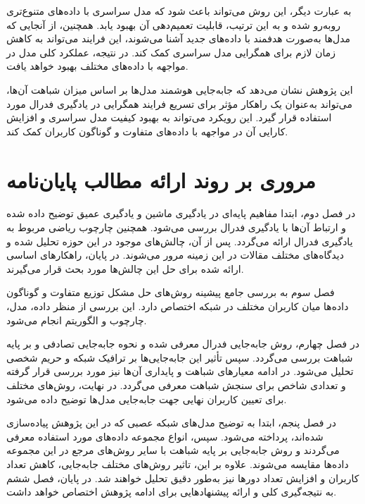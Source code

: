 به عبارت دیگر، این روش می‌تواند باعث شود که مدل سراسری با داده‌های متنوع‌تری روبه‌رو شده و به این ترتیب، قابلیت تعمیم‌دهی آن بهبود یابد. همچنین، از آنجایی که مدل‌ها به‌صورت هدفمند با داده‌های جدید آشنا می‌شوند، این فرایند می‌تواند به کاهش زمان لازم برای همگرایی مدل سراسری کمک کند. در نتیجه، عملکرد کلی مدل در مواجهه با داده‌های مختلف بهبود خواهد یافت.

این پژوهش نشان می‌دهد که جابه‌جایی هوشمند مدل‌ها بر اساس میزان شباهت آن‌ها، می‌تواند به‌عنوان یک راهکار مؤثر برای تسریع فرایند همگرایی در یادگیری فدرال مورد استفاده قرار گیرد. این رویکرد می‌تواند به بهبود کیفیت مدل سراسری و افزایش کارایی آن در مواجهه با داده‌های متفاوت و گوناگون کاربران کمک کند.



\section{مروری بر روند ارائه مطالب پایان‌نامه}

در فصل دوم، ابتدا مفاهیم پایه‌ای در یادگیری ماشین و یادگیری عمیق توضیح داده شده و ارتباط آن‌ها با یادگیری فدرال بررسی می‌شود. همچنین چارچوب ریاضی مربوط به یادگیری فدرال ارائه می‌گردد. پس از آن، چالش‌های موجود در این حوزه تحلیل شده و دیدگاه‌های مختلف مقالات در این زمینه مرور می‌شوند. در پایان، راهکارهای اساسی ارائه شده برای حل این چالش‌ها مورد بحث قرار می‌گیرند.

فصل سوم به بررسی جامع پیشینه روش‌های حل مشکل توزیع متفاوت و گوناگون داده‌ها میان کاربران مختلف در شبکه اختصاص دارد. این بررسی از منظر داده، مدل، چارچوب و الگوریتم انجام می‌شود.

در فصل چهارم، روش جابه‌جایی فدرال معرفی شده و نحوه جابه‌جایی تصادفی و بر پایه شباهت بررسی می‌گردد. سپس تأثیر این جابه‌جایی‌ها بر ترافیک شبکه و حریم شخصی تحلیل می‌شود. در ادامه معیارهای شباهت و پایداری آن‌ها نیز مورد بررسی قرار گرفته و تعدادی شاخص برای سنجش شباهت معرفی می‌گردد. در نهایت، روش‌های مختلف برای تعیین کاربران نهایی جهت جابه‌جایی مدل‌ها توضیح داده می‌شود.

در فصل پنجم، ابتدا به توضیح مدل‌های شبکه عصبی که در این پژوهش پیاده‌سازی شده‌اند، پرداخته می‌شود. سپس، انواع مجموعه داده‌های مورد استفاده معرفی می‌گردند و روش جابه‌جایی بر پایه شباهت با سایر روش‌های مرجع در این مجموعه داده‌ها مقایسه می‌شوند. علاوه بر این، تاثیر روش‌های مختلف جابه‌جایی، کاهش تعداد کاربران و افزایش تعداد دورها نیز به‌طور دقیق تحلیل خواهند شد.
در پایان، فصل ششم به نتیجه‌گیری کلی و ارائه پیشنهادهایی برای ادامه پژوهش اختصاص خواهد داشت.